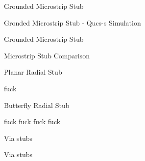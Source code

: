 \begin{frame}{Grounded Microstrip Stub}
\end{frame}

\begin{frame}{Gronded Microstrip Stub - Qucs-s Simulation}
\end{frame}

\begin{frame}{Grounded Microstrip Stub}
    \begin{twocolumns}[0.3]
        \leftcol
            \vspace{-30pt}
        \rightcol
            \vspace{-40pt}
    \end{twocolumns}
\end{frame}

\begin{frame}{Microstrip Stub Comparison}
    \vspace{-30pt}
\end{frame}

\begin{frame}{Planar Radial Stub}
    \begin{twocolumns}[0.5]
        \leftcol
            \vspace{-30pt}
        \rightcol
            fuck
    \end{twocolumns}
\end{frame}

\begin{frame}{Butterfly Radial Stub}
    \begin{twocolumns}[0.5]
        \leftcol
            \vspace{-30pt}
        \rightcol
            fuck fuck fuck fuck
    \end{twocolumns}
\end{frame}

\begin{frame}{Via stubs}
\end{frame}

\begin{frame}{Via stubs}
\end{frame}


